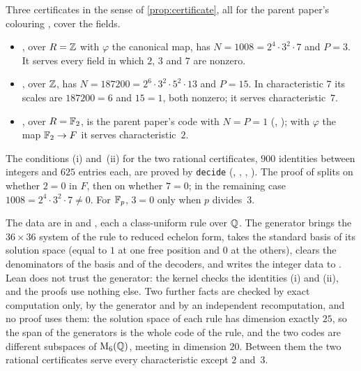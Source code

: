 \begin{outline}
Three certificates in the sense of \cref{prop:certificate}, all for the parent paper's colouring
, cover the fields.
\begin{itemize}[leftmargin=1.5em]
\item {}, over $R=\mathbb{Z}$ with $\varphi$ the canonical map, has $N=1008=2^4\cdot3^2\cdot7$ and $P=3$. It serves
every field in which $2$, $3$ and $7$ are nonzero.
\item {}, over $\mathbb{Z}$, has $N=187200=2^6\cdot3^2\cdot5^2\cdot13$ and $P=15$. In characteristic $7$ its scales
are $187200=6$ and $15=1$, both nonzero; it serves characteristic~$7$.
\item {}, over $R=\mathbb{F}_2$, is the parent paper's code with $N=P=1$ (,
); with $\varphi$ the map $\mathbb{F}_2\to F$ it serves characteristic~$2$.
\end{itemize}
The conditions (i) and~(ii) for the two rational certificates, $900$ identities between integers and $625$ entries each,
are proved by \texttt{decide} (, , ,
). The proof of  splits on whether $2=0$ in $F$, then on
whether $7=0$; in the remaining case $1008=2^4\cdot3^2\cdot7\ne0$. For $\mathbb{F}_p$, $3=0$ only when $p$ divides~$3$.
\end{outline}

\begin{remark}\label{rem:certificates}
The data are in  and , each a class-uniform
rule over $\mathbb{Q}$. The generator  brings the $36\times36$ system of the rule to
reduced echelon form, takes the standard basis of its solution space (equal to $1$ at one free position and $0$ at the
others), clears the denominators of the basis and of the decoders, and writes the integer data to
. Lean does not trust the generator: the kernel checks the identities (i) and (ii), and the
proofs use nothing else. Two further facts are checked by exact computation only, by the generator and by an
independent recomputation, and no proof uses them: the solution space of each rule has dimension exactly $25$, so the
span of the generators is the whole code of the rule, and the two codes are different subspaces of $\mathrm{M}_6(\mathbb{Q})$,
meeting in dimension $20$. Between them the two rational certificates serve every characteristic except $2$ and~$3$.
\end{remark}

